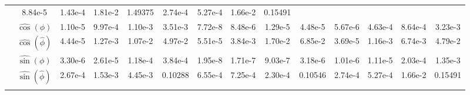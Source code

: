\begin{table}[b!]
\begin{tabular}{ c | c | c c c c | c c c c | c c c c }
                                        & 8.84e-5           & 1.43e-4           & 1.81e-2           & 1.49375
                                        & 2.74e-4           & 5.27e-4           & 1.66e-2           & 0.15491       \\ \arrayrulecolor{gray!20} \hline
    \multirow{4}{*}{\rotatebox[origin=c]{90}{$\mathcal{B}(2,5)$}} 
            & $\hat{\cos}(\phi)$        & 1.10e-5           & 9.97e-4           & 1.10e-3           & 3.51e-3
                                        & 7.72e-8           & 8.48e-6           & 1.29e-5           & 4.48e-5
                                        & 5.67e-6           & 4.63e-4           & 8.64e-4           & 3.23e-3       \\
            & $\hat{\cos}(\hat{\phi})$  & 4.44e-5           & 1.27e-3           & 1.07e-2           & 4.97e-2
                                        & 5.51e-5           & 3.84e-3           & 1.70e-2           & 6.85e-2
                                        & 3.69e-5           & 1.16e-3           & 6.74e-3           & 4.79e-2       \\
            & $\hat{\sin}(\phi)$        & 3.30e-6           & 2.61e-5           & 1.18e-4           & 3.84e-4
                                        & 1.95e-8           & 1.71e-7           & 9.03e-7           & 3.18e-6
                                        & 1.01e-6           & 1.11e-5           & 2.03e-4           & 1.35e-3       \\
            & $\hat{\sin}(\hat{\phi})$  & 2.67e-4           & 1.53e-3           & 4.45e-3           & 0.10288
                                        & 6.55e-4           & 7.25e-4           & 2.30e-4           & 0.10546
                                        & 2.74e-4           & 5.27e-4           & 1.66e-2           & 0.15491       \\ \arrayrulecolor{gray!20} \hline
    \end{tabular}
\end{table}

